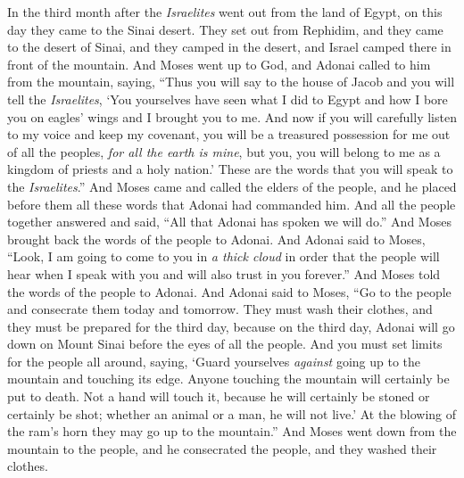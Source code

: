\begin{biblechapter} %
 In the third month after the \textit{Israelites} went out from the land of Egypt, on this day they came to the Sinai desert.
\verse They set out from Rephidim, and they came to the desert of Sinai, and they camped in the desert, and Israel camped there in front of the mountain.
\verse And Moses went up to God, and Adonai called to him from the mountain, saying, “Thus you will say to the house of Jacob and you will tell the \textit{Israelites},
\verse ‘You yourselves have seen what I did to Egypt and how I bore you on eagles’ wings and I brought you to me.
\verse And now if you will carefully listen to my voice and keep my covenant, you will be a treasured possession for me out of all the peoples, \textit{for all the earth is mine},
\verse but you, you will belong to me as a kingdom of priests and a holy nation.’ These are the words that you will speak to the \textit{Israelites}.”
\verse And Moses came and called the elders of the people, and he placed before them all these words that Adonai had commanded him.
\verse And all the people together answered and said, “All that Adonai has spoken we will do.” And Moses brought back the words of the people to Adonai.
\verse And Adonai said to Moses, “Look, I am going to come to you in \textit{a thick cloud} in order that the people will hear when I speak with you and will also trust in you forever.” And Moses told the words of the people to Adonai.
\verse And Adonai said to Moses, “Go to the people and consecrate them today and tomorrow. They must wash their clothes,
\verse and they must be prepared for the third day, because on the third day, Adonai will go down on Mount Sinai before the eyes of all the people.
\verse And you must set limits for the people all around, saying, ‘Guard yourselves \textit{against} going up to the mountain and touching its edge. Anyone touching the mountain will certainly be put to death.
\verse Not a hand will touch it, because he will certainly be stoned or certainly be shot; whether an animal or a man, he will not live.’ At the blowing of the ram’s horn they may go up to the mountain.”
\verse And Moses went down from the mountain to the people, and he consecrated the people, and they washed their clothes.

\end{biblechapter}
